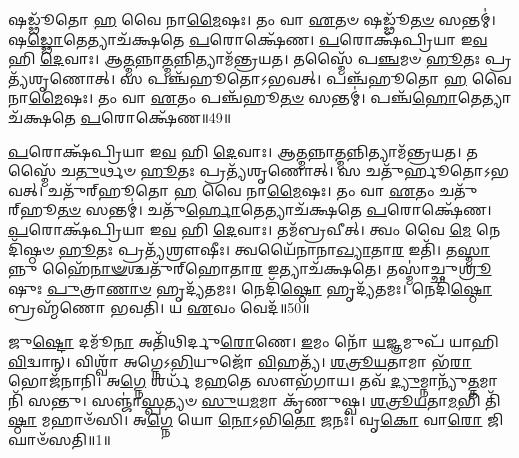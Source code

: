 𑌷𑌡𑍍𑌢𑍂᳴𑌤𑍋 \ul{𑌹} 𑌵𑍈 𑌨𑌾\-\ul{𑌮𑍈}\-𑌷𑌃।
𑌤𑌂 𑌵𑌾 \ul{𑌏}\-𑌤𑍞 𑌷𑌡𑍍𑌢𑍂᳴\-\ul{𑌤}\-\-\ul{𑍞} 𑌸𑌨𑍍𑌤𑌮𑍍॑।
𑌷\-\ul{𑌡𑍍𑌢𑍋}\-𑌤𑍇𑌤𑍍𑌯𑌾𑌚᳴𑌕𑍍𑌷𑌤𑍇 \ul{𑌪}\-𑌰𑍋𑌕𑍍𑌷𑍇᳴𑌣।
\-\ul{𑌪}\-𑌰𑍋𑌕𑍍𑌷᳴𑌪𑍍𑌰𑌿𑌯𑌾 𑌇\-\ul{𑌵} 𑌹𑌿 \ul{𑌦𑍇}\-𑌵𑌾𑌃।
𑌆\-\ul{𑌤𑍍𑌮}\-𑌨𑍍𑌨𑌾\-\ul{𑌤𑍍𑌮}\-𑌨𑍍𑌨𑌿𑌤𑍍𑌯𑌾𑌮᳴𑌨𑍍𑌤𑍍𑌰𑌯𑌤।
𑌤𑌸𑍍𑌮𑍈᳴ 𑌪\-\ul{𑌞𑍍𑌚}\-𑌮𑍞 \ul{𑌹𑍂}\-𑌤𑌃 𑌪𑍍𑌰𑌤𑍍𑌯᳴𑌶𑍃𑌣𑍋𑌤𑍍।
𑌸 𑌪𑌞𑍍𑌚᳴𑌹𑍂𑌤𑍋\-𑌽𑌭𑌵𑌤𑍍।
𑌪𑌞𑍍𑌚᳴𑌹𑍂𑌤𑍋 \ul{𑌹} 𑌵𑍈 𑌨𑌾\-\ul{𑌮𑍈}\-𑌷𑌃।
𑌤𑌂 𑌵𑌾 \ul{𑌏}\-𑌤𑌂 𑌪𑌞𑍍𑌚᳴𑌹𑍂\-\ul{𑌤}\-\-\ul{𑍞} 𑌸𑌨𑍍𑌤𑌮𑍍॑।
𑌪𑌞𑍍𑌚᳴\-\ul{𑌹𑍋}\-𑌤𑍇𑌤𑍍𑌯𑌾𑌚᳴𑌕𑍍𑌷𑌤𑍇 \ul{𑌪}\-𑌰𑍋𑌕𑍍𑌷𑍇᳴𑌣॥49॥

\-\ul{𑌪}\-𑌰𑍋𑌕𑍍𑌷᳴𑌪𑍍𑌰𑌿𑌯𑌾 𑌇\-\ul{𑌵} 𑌹𑌿 \ul{𑌦𑍇}\-𑌵𑌾𑌃।
𑌆\-\ul{𑌤𑍍𑌮}\-𑌨𑍍𑌨𑌾\-\ul{𑌤𑍍𑌮}\-𑌨𑍍𑌨𑌿𑌤𑍍𑌯𑌾𑌮᳴𑌨𑍍𑌤𑍍𑌰𑌯𑌤।
𑌤𑌸𑍍𑌮𑍈᳴ 𑌚\-\ul{𑌤𑍁}\-𑌰𑍍𑌥𑍞 \ul{𑌹𑍂}\-𑌤𑌃 𑌪𑍍𑌰𑌤𑍍𑌯᳴𑌶𑍃𑌣𑍋𑌤𑍍।
𑌸 𑌚𑌤𑍁᳴𑌰𑍍\mbox{}𑌹𑍂𑌤𑍋\-𑌽𑌭𑌵𑌤𑍍।
𑌚𑌤𑍁᳴𑌰𑍍‌\mbox{}𑌹𑍂𑌤𑍋 \ul{𑌹} 𑌵𑍈 𑌨𑌾\-\ul{𑌮𑍈}\-𑌷𑌃।
𑌤𑌂 𑌵𑌾 \ul{𑌏}\-𑌤𑌂 𑌚𑌤𑍁᳴𑌰𑍍‌\mbox{}𑌹𑍂\-\ul{𑌤}\-\-\ul{𑍞} 𑌸𑌨𑍍𑌤𑌮𑍍॑।
𑌚𑌤𑍁᳴\-\ul{𑌰𑍍𑌹𑍋}\-𑌤𑍇𑌤𑍍𑌯𑌾𑌚᳴𑌕𑍍𑌷𑌤𑍇 \ul{𑌪}\-𑌰𑍋𑌕𑍍𑌷𑍇᳴𑌣।
\-\ul{𑌪}\-𑌰𑍋𑌕𑍍𑌷᳴𑌪𑍍𑌰𑌿𑌯𑌾 𑌇\-\ul{𑌵} 𑌹𑌿 \ul{𑌦𑍇}\-𑌵𑌾𑌃।
𑌤𑌮᳴𑌬𑍍𑌰𑌵𑍀𑌤𑍍।
𑌤𑍍𑌵𑌂 𑌵𑍈 \ul{𑌮𑍇} 𑌨𑍇𑌦𑌿᳴𑌷𑍍𑌠𑍞 \ul{𑌹𑍂}\-𑌤𑌃 𑌪𑍍𑌰𑌤𑍍𑌯᳴𑌶𑍍𑌰𑍗𑌷𑍀𑌃।
𑌤𑍍𑌵𑌯𑍈᳴𑌨𑌾𑌨𑌾\-\ul{𑌖𑍍𑌯𑌾}\-𑌤𑌾\-\ul{𑌰} 𑌇𑌤𑌿᳴।
𑌤\-\ul{𑌸𑍍𑌮𑌾}\-𑌨𑍍𑌨𑍁 𑌹𑍈᳴\-\ul{𑌨𑌾}\-\-\ul{𑍟}\-𑌶𑍍𑌚𑌤𑍁᳴𑌰𑍍‌\mbox{}𑌹𑍋𑌤𑌾\-\ul{𑌰} 𑌇𑌤𑍍𑌯𑌾𑌚᳴𑌕𑍍𑌷𑌤𑍇।
𑌤𑌸𑍍𑌮𑌾॑𑌚𑍍𑌛𑍁\-\ul{𑌶𑍍𑌰𑍂}\-𑌷𑍁𑌃 \ul{𑌪𑍁}\-𑌤𑍍𑌰𑌾\-\ul{𑌣𑌾}\-\-\ul{𑍞} 𑌹𑍃𑌦𑍍𑌯᳴𑌤𑌮𑌃।
𑌨𑍇𑌦𑌿᳴\-\ul{𑌷𑍍𑌠𑍋} 𑌹𑍃𑌦𑍍𑌯᳴𑌤𑌮𑌃।
𑌨𑍇𑌦𑌿᳴\-\ul{𑌷𑍍𑌠𑍋} 𑌬𑍍𑌰𑌹𑍍𑌮᳴𑌣𑍋 𑌭𑌵𑌤𑌿।
𑌯 \ul{𑌏}\-𑌵𑌂 𑌵𑍇𑌦᳴॥50॥\anuvakamend[\-\ul{𑌦𑍇}\-𑌵𑌾𑌃 𑌷𑌡𑍍𑌢𑍂᳴𑌤𑍋\-𑌽𑌭\-\ul{𑌵}\-𑌤𑍍𑌪𑌞𑍍𑌚᳴\-\ul{𑌹𑍋}\-𑌤𑍇𑌤𑍍𑌯𑌾𑌚᳴𑌕𑍍𑌷𑌤𑍇 \ul{𑌪}\-𑌰𑍋𑌕𑍍𑌷𑍇᳴𑌣𑌾𑌶𑍍𑌰𑍗\-\ul{𑌷𑍀𑌃} 𑌷𑌟𑍍𑌚᳴]




\clearpage
{}
\setcounter{anuvakam}{0}

𑌜𑍁\-\ul{𑌷𑍍𑌟𑍋} 𑌦𑌮𑍂᳴\-\ul{𑌨𑌾} 𑌅𑌤𑌿᳴𑌥𑌿𑌰𑍍𑌦𑍁\-\ul{𑌰𑍋}\-𑌣𑍇।
\-\ul{𑌇}\-𑌮𑌂 𑌨𑍋᳴ \ul{𑌯}\-𑌜𑍍𑌞𑌮𑍁𑌪᳴ 𑌯𑌾𑌹𑌿 \ul{𑌵𑌿}\-𑌦𑍍𑌵𑌾𑌨𑍍।
𑌵𑌿𑌶𑍍𑌵𑌾᳴ 𑌅𑌗𑍍𑌨𑍇\-𑌽\-\ul{𑌭𑌿}\-𑌯𑍁𑌜𑍋᳴ \ul{𑌵𑌿}\-𑌹𑌤𑍍𑌯᳴।
\-\ul{𑌶}\-\-\ul{𑌤𑍍𑌰𑍂}\-\-\ul{𑌯}\-𑌤𑌾𑌮𑌾 𑌭᳴\-\ul{𑌰𑌾} 𑌭𑍋𑌜᳴𑌨𑌾𑌨𑌿।
𑌅\-\ul{𑌗𑍍𑌨𑍇} 𑌶𑌰𑍍𑌧᳴ 𑌮\-\ul{𑌹}\-𑌤𑍇 𑌸𑍗𑌭᳴𑌗𑌾𑌯।
𑌤𑌵᳴ \ul{𑌦𑍍𑌯𑍁}\-𑌮𑍍𑌨𑌾𑌨𑍍𑌯𑍁᳴\-\ul{𑌤𑍍𑌤}\-𑌮𑌾𑌨𑌿᳴ 𑌸𑌨𑍍𑌤𑍁।
𑌸𑌞𑍍𑌜𑌾॑\-\ul{𑌸𑍍𑌪}\-𑌤𑍍𑌯𑍞 \ul{𑌸𑍁}\-𑌯\-\ul{𑌮}\-𑌮𑌾 𑌕𑍃᳴𑌣𑍁𑌷𑍍𑌵।
\-\ul{𑌶}\-\-\ul{𑌤𑍍𑌰𑍂}\-\-\ul{𑌯}\-𑌤𑌾\-\ul{𑌮}\-𑌭𑌿 𑌤𑌿᳴\-\ul{𑌷𑍍𑌠𑌾} 𑌮𑌹𑌾𑍞᳴𑌸𑌿।
𑌅\-\ul{𑌗𑍍𑌨𑍇} 𑌯𑍋 \ul{𑌨𑍋}\-\-𑌽𑌭𑌿\-\ul{𑌤𑍋} 𑌜𑌨𑌃᳴।
𑌵𑍃\-\ul{𑌕𑍋} 𑌵𑌾\-\ul{𑌰𑍋} 𑌜𑌿𑌘𑌾𑍞᳴𑌸𑌤𑌿॥1॥

